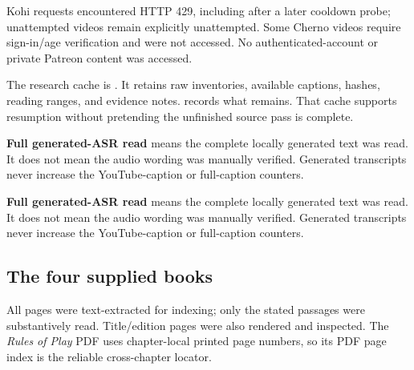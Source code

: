 Kohi requests encountered HTTP 429, including after a later cooldown probe; unattempted videos remain explicitly unattempted. Some Cherno videos require sign-in/age verification and were not accessed. No authenticated-account or private Patreon content was accessed.

The research cache is . It retains raw inventories, available captions, hashes, reading ranges, and evidence notes.  records what remains. That cache supports resumption without pretending the unfinished source pass is complete.

\textbf{Full generated-ASR read} means the complete locally generated text was read. It does not mean the audio wording was manually verified. Generated transcripts never increase the YouTube-caption or full-caption counters.

\textbf{Full generated-ASR read} means the complete locally generated text was read. It does not mean the audio wording was manually verified. Generated transcripts never increase the YouTube-caption or full-caption counters.

\subsection{The four supplied books}\label{appendix-877738f6f4d2-the-four-supplied-books}

\hypertarget{appendix-877738f6f4d2-the-four-supplied-books}{}

All pages were text-extracted for indexing; only the stated passages were substantively read. Title/edition pages were also rendered and inspected. The \emph{Rules of Play} PDF uses chapter-local printed page numbers, so its PDF page index is the reliable cross-chapter locator.

